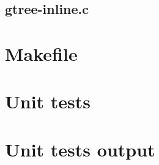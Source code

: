 \subsection{gtree-inline.c}

\begin{scriptsize}
\begin{ttfamily}

\end{ttfamily}
\end{scriptsize}

\section{Makefile}

\begin{scriptsize}
\begin{ttfamily}

\end{ttfamily}
\end{scriptsize}

\section{Unit tests}

\begin{scriptsize}
\begin{ttfamily}

\end{ttfamily}
\end{scriptsize}

\section{Unit tests output}

\begin{scriptsize}
\begin{ttfamily}

\end{ttfamily}
\end{scriptsize}


